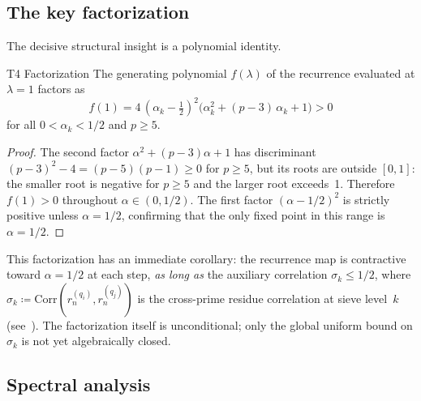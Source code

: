\documentclass[12pt,a4paper]{article}
\begin{document}
\subsection{The key factorization}
\label{sec:ch7_factorization}

The decisive structural insight is a polynomial identity.

\begin{thmbox}{T4 Factorization}
\label{thm:factorization}
The generating polynomial $f(\lambda)$ of the recurrence
evaluated at $\lambda = 1$ factors as
\begin{equation}
  f(1) = 4\,(\alpha_k - \tfrac{1}{2})^2
  \bigl(\alpha_k^2 + (p-3)\,\alpha_k + 1\bigr) > 0
  \label{eq:factorization}
\end{equation}
for all $0 < \alpha_k < 1/2$ and $p \geq 5$.

\begin{proof}
The second factor $\alpha^2 + (p-3)\alpha + 1$ has discriminant
$(p-3)^2 - 4 = (p-5)(p-1) \geq 0$ for $p \geq 5$, but its roots
are outside $[0,1]$: the smaller root is negative for $p \geq 5$
and the larger root exceeds~1. Therefore $f(1) > 0$ throughout
$\alpha \in (0, 1/2)$. The first factor $({\alpha - 1/2})^2$ is
strictly positive unless $\alpha = 1/2$, confirming that the only
fixed point in this range is $\alpha = 1/2$.
\end{proof}
\end{thmbox}

This factorization has an immediate corollary: the recurrence map
is contractive toward $\alpha = 1/2$ at each step, \emph{as long as}
the auxiliary correlation $\sigma_k \leq 1/2$, where
$\sigma_k \coloneqq \mathrm{Corr}(r_n^{(q_i)}, r_n^{(q_j)})$ is the
cross-prime residue correlation at sieve level~$k$ (see~\cite{companion_M1}).
The factorization itself is unconditional; only the global uniform
bound on $\sigma_k$ is not yet algebraically closed.

\subsection{Spectral analysis}
\label{sec:ch7_spectral}
\end{document}

